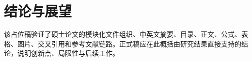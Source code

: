 \chapter{结论与展望}

该占位稿验证了硕士论文的模块化文件组织、中英文摘要、目录、正文、公式、表格、图片、交叉引用和参考文献链路。正式稿应在此概括由研究结果直接支持的结论，说明创新点、局限性与后续工作。
